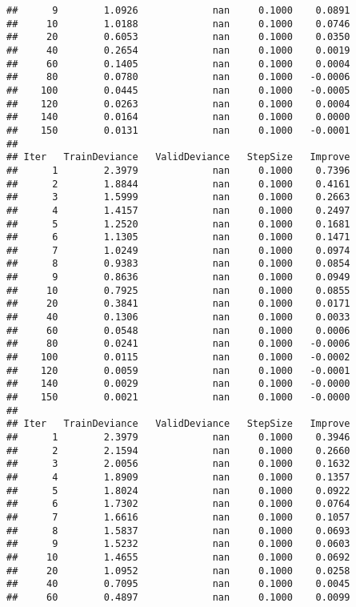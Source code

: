 \documentclass[]{article}
\begin{document}
\begin{verbatim}
##      9        1.0926             nan     0.1000    0.0891
##     10        1.0188             nan     0.1000    0.0746
##     20        0.6053             nan     0.1000    0.0350
##     40        0.2654             nan     0.1000    0.0019
##     60        0.1405             nan     0.1000    0.0004
##     80        0.0780             nan     0.1000   -0.0006
##    100        0.0445             nan     0.1000   -0.0005
##    120        0.0263             nan     0.1000    0.0004
##    140        0.0164             nan     0.1000    0.0000
##    150        0.0131             nan     0.1000   -0.0001
## 
## Iter   TrainDeviance   ValidDeviance   StepSize   Improve
##      1        2.3979             nan     0.1000    0.7396
##      2        1.8844             nan     0.1000    0.4161
##      3        1.5999             nan     0.1000    0.2663
##      4        1.4157             nan     0.1000    0.2497
##      5        1.2520             nan     0.1000    0.1681
##      6        1.1305             nan     0.1000    0.1471
##      7        1.0249             nan     0.1000    0.0974
##      8        0.9383             nan     0.1000    0.0854
##      9        0.8636             nan     0.1000    0.0949
##     10        0.7925             nan     0.1000    0.0855
##     20        0.3841             nan     0.1000    0.0171
##     40        0.1306             nan     0.1000    0.0033
##     60        0.0548             nan     0.1000    0.0006
##     80        0.0241             nan     0.1000   -0.0006
##    100        0.0115             nan     0.1000   -0.0002
##    120        0.0059             nan     0.1000   -0.0001
##    140        0.0029             nan     0.1000   -0.0000
##    150        0.0021             nan     0.1000   -0.0000
## 
## Iter   TrainDeviance   ValidDeviance   StepSize   Improve
##      1        2.3979             nan     0.1000    0.3946
##      2        2.1594             nan     0.1000    0.2660
##      3        2.0056             nan     0.1000    0.1632
##      4        1.8909             nan     0.1000    0.1357
##      5        1.8024             nan     0.1000    0.0922
##      6        1.7302             nan     0.1000    0.0764
##      7        1.6616             nan     0.1000    0.1057
##      8        1.5837             nan     0.1000    0.0693
##      9        1.5232             nan     0.1000    0.0603
##     10        1.4655             nan     0.1000    0.0692
##     20        1.0952             nan     0.1000    0.0258
##     40        0.7095             nan     0.1000    0.0045
##     60        0.4897             nan     0.1000    0.0099

\end{verbatim}
\end{document}
